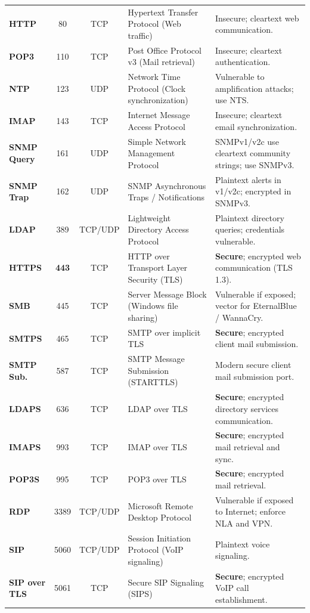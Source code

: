 \begin{table}[htbp]
\begin{tabularx}{\textwidth}{l c c p{4.2cm} X}
\textbf{HTTP} & 80 & TCP & Hypertext Transfer Protocol (Web traffic) & Insecure; cleartext web communication. \\
\textbf{POP3} & 110 & TCP & Post Office Protocol v3 (Mail retrieval) & Insecure; cleartext authentication. \\
\textbf{NTP} & 123 & UDP & Network Time Protocol (Clock synchronization) & Vulnerable to amplification attacks; use NTS. \\
\textbf{IMAP} & 143 & TCP & Internet Message Access Protocol & Insecure; cleartext email synchronization. \\
\textbf{SNMP Query} & 161 & UDP & Simple Network Management Protocol & SNMPv1/v2c use cleartext community strings; use SNMPv3. \\
\textbf{SNMP Trap} & 162 & UDP & SNMP Asynchronous Traps / Notifications & Plaintext alerts in v1/v2c; encrypted in SNMPv3. \\
\textbf{LDAP} & 389 & TCP/UDP & Lightweight Directory Access Protocol & Plaintext directory queries; credentials vulnerable. \\
\textbf{HTTPS} & \textbf{443} & TCP & HTTP over Transport Layer Security (TLS) & \textbf{Secure}; encrypted web communication (TLS 1.3). \\
\textbf{SMB} & 445 & TCP & Server Message Block (Windows file sharing) & Vulnerable if exposed; vector for EternalBlue / WannaCry. \\
\textbf{SMTPS} & 465 & TCP & SMTP over implicit TLS & \textbf{Secure}; encrypted client mail submission. \\
\textbf{SMTP Sub.} & 587 & TCP & SMTP Message Submission (STARTTLS) & Modern secure client mail submission port. \\
\textbf{LDAPS} & 636 & TCP & LDAP over TLS & \textbf{Secure}; encrypted directory services communication. \\
\textbf{IMAPS} & 993 & TCP & IMAP over TLS & \textbf{Secure}; encrypted mail retrieval and sync. \\
\textbf{POP3S} & 995 & TCP & POP3 over TLS & \textbf{Secure}; encrypted mail retrieval. \\
\textbf{RDP} & 3389 & TCP/UDP & Microsoft Remote Desktop Protocol & Vulnerable if exposed to Internet; enforce NLA and VPN. \\
\textbf{SIP} & 5060 & TCP/UDP & Session Initiation Protocol (VoIP signaling) & Plaintext voice signaling. \\
\textbf{SIP over TLS} & 5061 & TCP & Secure SIP Signaling (SIPS) & \textbf{Secure}; encrypted VoIP call establishment. \\
\bottomrule
\end{tabularx}
\end{table}

